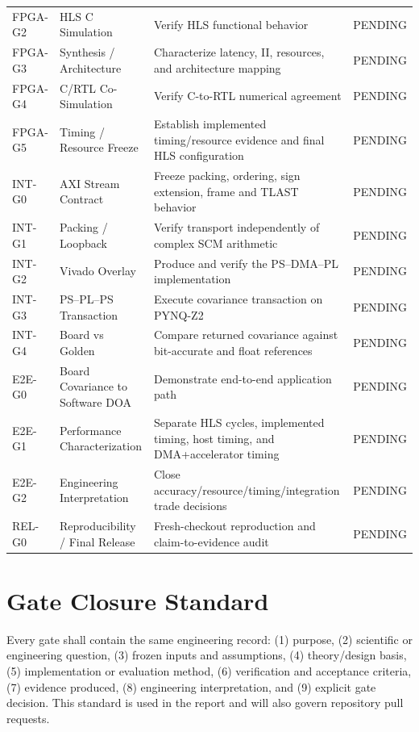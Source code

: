 \begin{longtable}{@{}p{}p{}p{}p{}@{}}
FPGA-G2 & HLS C Simulation & Verify HLS functional behavior & PENDING\\
FPGA-G3 & Synthesis / Architecture & Characterize latency, II, resources, and architecture mapping & PENDING\\
FPGA-G4 & C/RTL Co-Simulation & Verify C-to-RTL numerical agreement & PENDING\\
FPGA-G5 & Timing / Resource Freeze & Establish implemented timing/resource evidence and final HLS configuration & PENDING\\
\midrule
INT-G0 & AXI Stream Contract & Freeze packing, ordering, sign extension, frame and TLAST behavior & PENDING\\
INT-G1 & Packing / Loopback & Verify transport independently of complex SCM arithmetic & PENDING\\
INT-G2 & Vivado Overlay & Produce and verify the PS--DMA--PL implementation & PENDING\\
INT-G3 & PS--PL--PS Transaction & Execute covariance transaction on PYNQ-Z2 & PENDING\\
INT-G4 & Board vs Golden & Compare returned covariance against bit-accurate and float references & PENDING\\
\midrule
E2E-G0 & Board Covariance to Software DOA & Demonstrate end-to-end application path & PENDING\\
E2E-G1 & Performance Characterization & Separate HLS cycles, implemented timing, host timing, and DMA+accelerator timing & PENDING\\
E2E-G2 & Engineering Interpretation & Close accuracy/resource/timing/integration trade decisions & PENDING\\
REL-G0 & Reproducibility / Final Release & Fresh-checkout reproduction and claim-to-evidence audit & PENDING\\
\end{longtable}

\section{Gate Closure Standard}
Every gate shall contain the same engineering record: (1) purpose, (2) scientific or
engineering question, (3) frozen inputs and assumptions, (4) theory/design basis,
(5) implementation or evaluation method, (6) verification and acceptance criteria,
(7) evidence produced, (8) engineering interpretation, and (9) explicit gate decision.
This standard is used in the report and will also govern repository pull requests.

